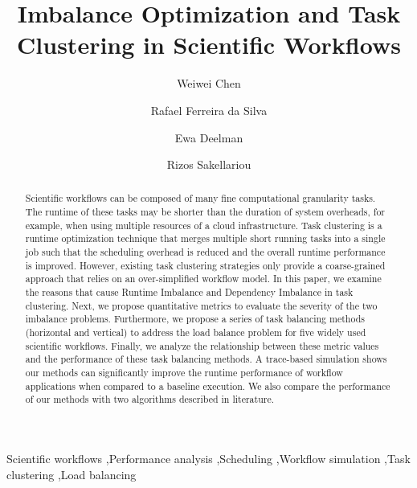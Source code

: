 \documentclass[final,5p,times,twocolumn]{elsarticle}
\begin{document}
\begin{frontmatter}

\title{Imbalance Optimization and Task Clustering in Scientific Workflows}


\author[isi]{Weiwei Chen}

\author[isi]{Rafael Ferreira da Silva}

\author[isi]{Ewa Deelman}

\author[man]{Rizos Sakellariou}



\address[isi]{University of Southern California, Information Sciences Institute, Marina del Rey, CA, USA}
\address[man]{University of Manchester, School of Computer Science, Manchester, U.K.}


\begin{abstract}
Scientific workflows can be composed of many fine computational granularity tasks. The runtime of these tasks may be shorter than the duration of system overheads, for example, when using multiple resources of a cloud infrastructure. Task clustering is a runtime optimization technique that merges multiple short running tasks into a single job such that the scheduling overhead is reduced and the overall runtime performance is improved. However, existing task clustering strategies only provide a coarse-grained approach that relies on an over-simplified workflow model. In this paper, we examine the reasons that cause Runtime Imbalance and Dependency Imbalance in task clustering. Next, we propose quantitative metrics to evaluate the severity of the two imbalance problems. Furthermore, we propose a series of task balancing methods (horizontal and vertical) to address the load balance problem for five widely used scientific workflows. Finally, we analyze the relationship between these metric values and the performance of these task balancing methods. A trace-based simulation shows our methods can significantly improve the runtime performance of workflow applications when compared to a baseline execution. We also compare the performance of our methods with two algorithms described in literature.

\end{abstract}

\begin{keyword}
Scientific workflows \sep Performance analysis \sep Scheduling \sep Workflow simulation \sep Task clustering \sep Load balancing
\end{keyword}

\end{frontmatter}















\end{document}
